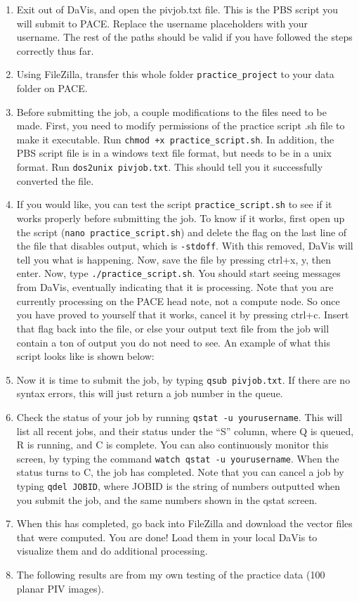 \documentclass{article}
\newcommand{\quotes}[1]{``#1''}
\begin{document}
\begin{enumerate}
		\item Exit out of DaVis, and open the pivjob.txt file.  This is the PBS script you will submit to PACE.  Replace the username placeholders with your username.  The rest of the paths should be valid if you have followed the steps correctly thus far.
		\item Using FileZilla, transfer this whole folder \texttt{practice\_project} to your data folder on PACE.
		\item Before submitting the job, a couple modifications to the files need to be made.  First, you need to modify permissions of the practice script .sh file to make it executable.  Run \texttt{chmod +x practice\_script.sh}.  In addition, the PBS script file is in a windows text file format, but needs to be in a unix format.  Run \texttt{dos2unix pivjob.txt}.  This should tell you it successfully converted the file.
		\item If you would like, you can test the script \texttt{practice\_script.sh} to see if it works properly before submitting the job.  To know if it works, first open up the script (\texttt{nano practice\_script.sh}) and delete the flag on the last line of the file that disables output, which is \texttt{-stdoff}.  With this removed, DaVis will tell you what is happening.  Now, save the file by pressing ctrl+x, y, then enter.  Now, type \texttt{./practice\_script.sh}.  You should start seeing messages from DaVis, eventually indicating that it is processing.  Note that you are currently processing on the PACE head note, not a compute node.  So once you have proved to yourself that it works, cancel it by pressing ctrl+c.  Insert that flag back into the file, or else your output text file from the job will contain a ton of output you do not need to see.  An example of what this script looks like is shown below:
		
		
		\item Now it is time to submit the job, by typing \texttt{qsub pivjob.txt}.  If there are no syntax errors, this will just return a job number in the queue.
		\item Check the status of your job by running \texttt{qstat -u yourusername}.  This will list all recent jobs, and their status under the \quotes{S} column, where Q is queued, R is running, and C is complete.  You can also continuously monitor this screen, by typing the command \texttt{watch qstat -u yourusername}.  When the status turns to C, the job has completed.  Note that you can cancel a job by typing \texttt{qdel JOBID}, where JOBID is the string of numbers outputted when you submit the job, and the same numbers shown in the qstat screen.
		\item When this has completed, go back into FileZilla and download the vector files that were computed.  You are done!  Load them in your local DaVis to visualize them and do additional processing.
		\item The following results are from my own testing of the practice data (100 planar PIV images).
		

\end{enumerate}
\end{document}
